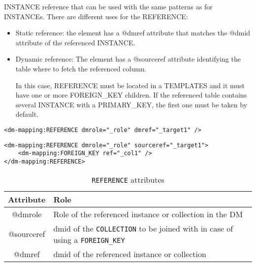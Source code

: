 INSTANCE reference that can be used with the same patterns as for INSTANCEs.
There are different uses for the REFERENCE:

\begin{itemize}
    \item Static reference: the element has a @dmref attribute that matches the @dmid attribute of the referenced INSTANCE.
    \item Dynamic reference: The element has a @sourceref attribute identifying  the table where to fetch the referenced column. 
    
             In this case, REFERENCE must be located in a TEMPLATES and it must have one or more FOREIGN\_KEY children. 
             If the referenced table contains several INSTANCE with a PRIMARY\_KEY, the first one must be taken by default.
\end{itemize}

\begin{lstlisting}[frame=single,caption={Simple \texttt{REFERENCE}, to be replaced with the INSTANCE having @dmid=\_target1 },style=XML,basicstyle=\tiny]
<dm-mapping:REFERENCE dmrole="_role" dmref="_target1" />
\end{lstlisting}

\begin{lstlisting}[frame=single,caption={Dynamic \texttt{REFERENCE}, to be replaced with the INSTANCE of the table of collection \_target1 and having a PRIMARY\_KEY matching the value of column  \_col1. This pattern is valid in the context of a TEMPLATES},style=XML,basicstyle=\tiny]
<dm-mapping:REFERENCE dmrole="_role" sourceref="_target1">
    <dm-mapping:FOREIGN_KEY ref="_col1" />
</dm-mapping:REFERENCE>
\end{lstlisting}

\begin{table}[!htbp]
\small
\centering
\begin{tabulary}{\linewidth}{|c|J|}       
       \hline 
            \textbf{Attribute} & 
            \textbf {Role}\\
       \hline         \hline  
            @dmrole & 
            Role of the referenced instance or collection in the DM \\
        \hline 
            @sourceref& 
            dmid of the \texttt{COLLECTION} to be joined with in case of using a \texttt{FOREIGN\_KEY} \\
        \hline 
            @dmref & 
            dmid of the referenced instance or collection\\
        \hline 
     \end{tabulary}
     \caption{\texttt{REFERENCE} attributes} 
     \label{tbl:reference-att}
 \end{table}

